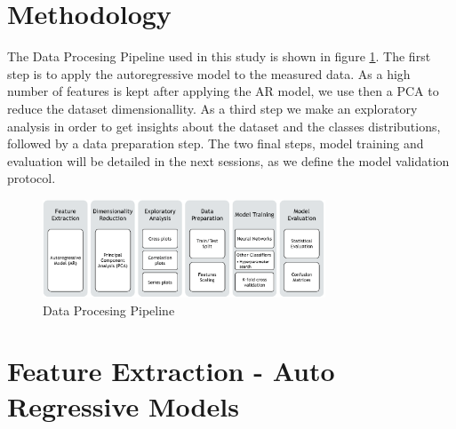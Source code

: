 \documentclass[twocolumn]{article}
\begin{document}

\section{Methodology}

The Data Procesing Pipeline used in this study is shown in figure \ref{fig:dip}. The first step is to apply the autoregressive model to the measured data. As a high number of features is kept after applying the AR model, we use then a PCA to reduce the dataset dimensionallity. As a third step we make an exploratory analysis in order to get insights about the dataset and the classes distributions, followed by a data preparation step. The two final steps, model training and evaluation will be detailed in the next sessions, as we define the model validation protocol.

\begin{figure}[h!]
      \centering
      \includegraphics[width=0.75\textwidth]{DIP.PNG}
      \caption{Data Procesing Pipeline}
      \label{fig:dip}
\end{figure}



\section{Feature Extraction - Auto Regressive Models}
\end{document}
